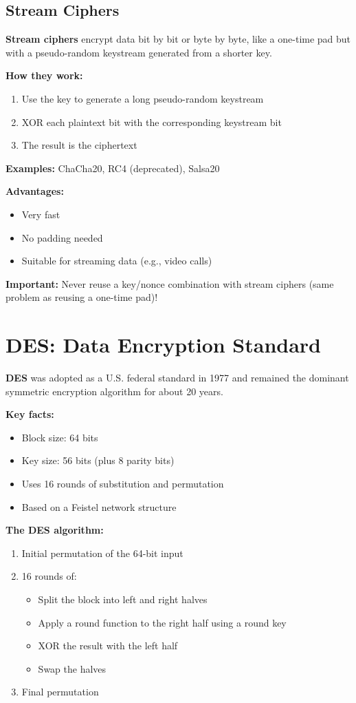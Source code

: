 \documentclass[11pt,a4paper]{report}
\begin{document}
\subsection{Stream Ciphers}

\textbf{Stream ciphers} encrypt data bit by bit or byte by byte, like a one-time pad but with a pseudo-random keystream generated from a shorter key.

\textbf{How they work:}
\begin{enumerate}
\item Use the key to generate a long pseudo-random keystream
\item XOR each plaintext bit with the corresponding keystream bit
\item The result is the ciphertext
\end{enumerate}

\textbf{Examples:} ChaCha20, RC4 (deprecated), Salsa20

\textbf{Advantages:}
\begin{itemize}
\item Very fast
\item No padding needed
\item Suitable for streaming data (e.g., video calls)
\end{itemize}

\textbf{Important:} Never reuse a key/nonce combination with stream ciphers (same problem as reusing a one-time pad)!

\newpage
\section{DES: Data Encryption Standard}

\textbf{DES} was adopted as a U.S. federal standard in 1977 and remained the dominant symmetric encryption algorithm for about 20 years.

\textbf{Key facts:}
\begin{itemize}
\item Block size: 64 bits
\item Key size: 56 bits (plus 8 parity bits)
\item Uses 16 rounds of substitution and permutation
\item Based on a Feistel network structure
\end{itemize}

\textbf{The DES algorithm:}
\begin{enumerate}
\item Initial permutation of the 64-bit input
\item 16 rounds of:
   \begin{itemize}
   \item Split the block into left and right halves
   \item Apply a round function to the right half using a round key
   \item XOR the result with the left half
   \item Swap the halves
   \end{itemize}
\item Final permutation
\end{enumerate}
\end{document}
